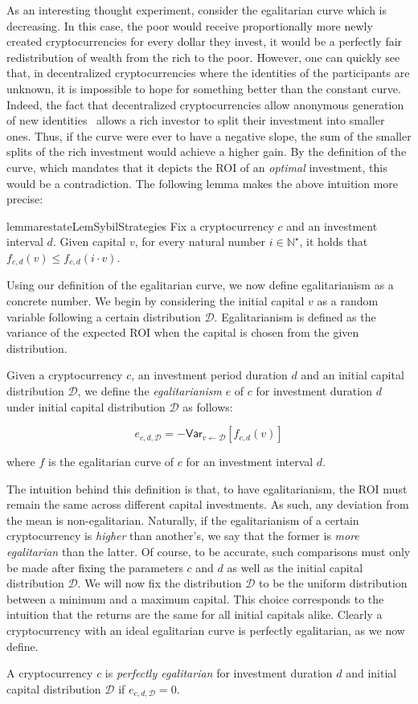 As an interesting thought experiment, consider the egalitarian curve which is
decreasing. In this case, the poor would receive proportionally more newly
created cryptocurrencies for every dollar they invest, \ie it would be a
perfectly fair redistribution of wealth from the rich to the poor. However, one
can quickly see that, in decentralized cryptocurrencies where the identities of
the participants are unknown, it is impossible to
hope for something better than the constant curve. Indeed, the fact that
decentralized cryptocurrencies allow anonymous generation of new
identities~\cite{douceur2002sybil}
allows a rich investor to split their investment into smaller ones.  Thus, if
the curve were ever to have a negative slope, the sum of the smaller splits of
the rich investment would achieve a higher gain. By the definition of the
curve, which mandates that it depicts the ROI of an \emph{optimal} investment,
this would be a contradiction. The following lemma makes the above intuition
more precise:

\begin{restatable}{lemma}{restateLemSybilStrategies}
\label{lem:sybil}
    Fix a cryptocurrency $c$ and an investment interval $d$. Given capital $v$,
    for every natural number $i \in \mathbb{N}^\star$, it
    holds that $f_{c,d}(v) \leq f_{c,d}(i \cdot v)$.
\end{restatable}

Using our definition of the egalitarian curve, we now define egalitarianism as
a concrete number. We begin by considering the initial capital $v$ as a random
variable following a certain distribution $\mathcal{D}$. Egalitarianism is
defined as the variance of the expected ROI when the capital is chosen from the
given distribution.

\begin{definition}[Egalitarianism]
  Given a cryptocurrency $c$, an investment period duration $d$ and an initial
  capital distribution $\mathcal{D}$, we define the \emph{egalitarianism} $e$ of $c$
  for investment duration $d$ under initial capital distribution $\mathcal{D}$
  as follows:

  \[
    e_{c,d,\mathcal{D}} = -\textsf{Var}_{v \gets \mathcal{D}}[f_{c,d}(v)]
  \]

  where $f$ is the egalitarian curve of $c$ for an investment interval $d$.
\end{definition}

The intuition behind this definition is that, to have egalitarianism, the ROI
must remain the same across different capital investments. As such, any
deviation from the mean is non-egalitarian. Naturally, if the
egalitarianism of a certain cryptocurrency is \emph{higher} than another's, we
say that the former is \emph{more egalitarian} than the latter. Of course, to be
accurate, such comparisons must only be made after fixing the parameters $c$
and $d$ as well as the initial capital distribution $\mathcal{D}$. We will now
fix the distribution $\mathcal{D}$ to be the uniform distribution between a
minimum and a maximum capital. This choice corresponds to the intuition that the
returns are the same for all initial capitals alike. Clearly a cryptocurrency
with an ideal egalitarian curve is perfectly egalitarian, as we now define.

\begin{definition}
  A cryptocurrency $c$ is \emph{perfectly egalitarian} for investment duration
  $d$ and initial capital distribution $\mathcal{D}$ if
  $e_{c,d,\mathcal{D}} = 0$.
\end{definition}
